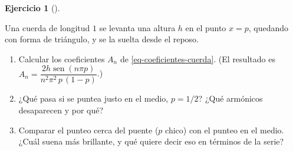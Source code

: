 \documentclass[
  spanish,
  a4paper,
]{scrbook}
\providecommand{\tightlist}{%
  \setlength{\itemsep}{0pt}\setlength{\parskip}{0pt}}
\theoremstyle{definition}
\theoremstyle{plain}
\theoremstyle{definition}
\theoremstyle{plain}
\theoremstyle{definition}
\newtheorem{exercise}{Ejercicio}[chapter]
\theoremstyle{remark}
\begin{document}
\begin{exercise}[]\protect\hypertarget{exr-cuerda-punteada}{}\label{exr-cuerda-punteada}

Una cuerda de longitud \(1\) se levanta una altura \(h\) en el punto
\(x=p\), quedando con forma de triángulo, y se la suelta desde el
reposo.

\begin{enumerate}
\def\labelenumi{\alph{enumi}.}
\tightlist
\item
  Calcular los coeficientes \(A_n\) de \ref{eq-coeficientes-cuerda}. (El
  resultado es
  \(A_n = \dfrac{2h\operatorname{sen}(n\pi p)}{n^2\pi^2\,p\,(1-p)}\).)
\item
  ¿Qué pasa si se puntea justo en el medio, \(p=1/2\)? ¿Qué armónicos
  desaparecen y por qué?
\item
  Comparar el punteo cerca del puente (\(p\) chico) con el punteo en el
  medio. ¿Cuál suena más brillante, y qué quiere decir eso en términos
  de la serie?
\end{enumerate}

\end{exercise}
\end{document}
